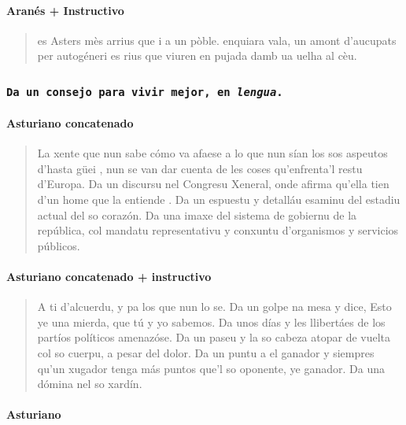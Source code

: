 \paragraph{Aranés + Instructivo}

\begin{quote}
es Asters mès arrius que i a un pòble. enquiara vala, un amont d'aucupats per autogéneri es rius que viuren en pujada damb ua uelha al cèu.
\end{quote}

\subsubsection{\fontsize{15}{15}\texttt{Da un consejo para vivir mejor, en \textit{lengua}.}}

\paragraph{Asturiano concatenado}

\begin{quote}
La xente que nun sabe cómo va afaese a lo que nun sían los sos aspeutos d'hasta güei , nun se van dar cuenta de les coses qu'enfrenta'l restu d'Europa.
Da un discursu nel Congresu Xeneral, onde afirma qu'ella tien d'un home que la entiende .
Da un espuestu y detalláu esaminu del estadiu actual del so corazón.
Da una imaxe del sistema de gobiernu de la república, col mandatu representativu y conxuntu d'organismos y servicios públicos.
\end{quote}

\paragraph{Asturiano concatenado + instructivo}

\begin{quote}
A ti d'alcuerdu, y pa los que nun lo se.
Da un golpe na mesa y dice, Esto ye una mierda, que tú y yo sabemos.
Da unos días y les llibertáes de los partíos políticos amenazóse.
Da un paseu y la so cabeza atopar de vuelta col so cuerpu, a pesar del dolor.
Da un puntu a el ganador y siempres qu'un xugador tenga más puntos que'l so oponente, ye ganador.
Da una dómina nel so xardín.
\end{quote}

\paragraph{Asturiano}

